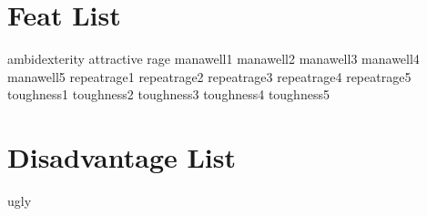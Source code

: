 \begin{multicols*}{2}
    \section{Feat List}
    {ambidexterity}
    {attractive}
    {rage}
    {manawell1}
    {manawell2}
    {manawell3}
    {manawell4}
    {manawell5}
    {repeatrage1}
    {repeatrage2}
    {repeatrage3}
    {repeatrage4}
    {repeatrage5}
    {toughness1}
    {toughness2}
    {toughness3}
    {toughness4}
    {toughness5}

    \section{Disadvantage List}
    {ugly}

\end{multicols*}
